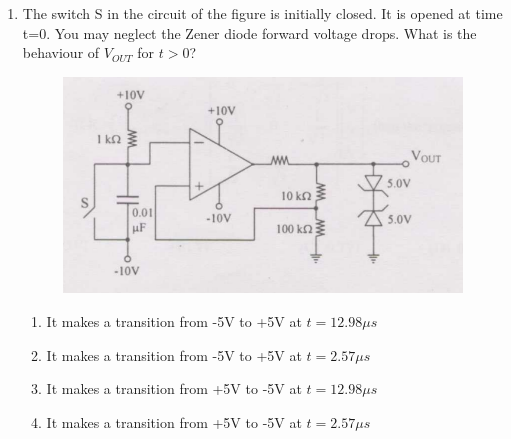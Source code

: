 \documentclass[journal,,12pt,onecolumn]{IEEEtran}
\theoremstyle{remark}
\begin{document}
\begin{enumerate}
\begin{enumerate}
\end{enumerate}
\bigskip
\item The switch S in the circuit of the figure is initially closed. It is opened at time t=0. You may neglect the Zener diode forward voltage drops. What is the behaviour of $V_{OUT}$ for $t>0$? 
\begin{figure}[H]
   \centering
   \includegraphics[width=0.7\linewidth]{figs/fig_4.png}
   \label{stemplot}
\end{figure}
\begin{enumerate}
    \item It makes a transition from -5V to +5V at $t=12.98\mu s$
    \item It makes a transition from -5V to +5V at $t=2.57\mu s$
    \item It makes a transition from +5V to -5V at $t=12.98\mu s$
    \item It makes a transition from +5V to -5V at $t=2.57\mu s$


\end{enumerate}
\end{enumerate}
\end{document}
